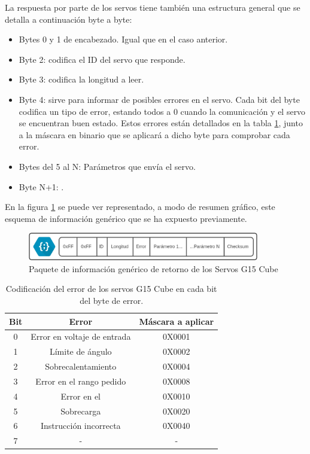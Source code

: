 	La respuesta por parte de los servos tiene también una estructura general que se detalla a continuación byte a byte:
	\begin{itemize}
		\item Bytes 0 y 1 de encabezado. Igual que en el caso anterior.
		\item Byte 2: codifica el ID del servo que responde.
		\item Byte 3: codifica la longitud a leer.
		\item Byte 4: sirve para informar de posibles errores en el servo. Cada bit del byte codifica un tipo de error, estando todos a 0 cuando la comunicación y el servo se encuentran buen estado. Estos errores están detallados en la tabla \ref{tab:g15_error}, junto a la máscara en binario que se aplicará a dicho byte para comprobar cada error.
		\item Bytes del 5 al N: Parámetros que envía el servo.
		\item Byte N+1: .
	\end{itemize}

	 En la figura \ref{fig:app:registrosg15:comunicacion_mensaje_from_servo} se puede ver representado, a modo de resumen gráfico, este esquema de información genérico que se ha expuesto previamente.

	 \begin{figure}[H]
	    	\centering
	    	\includegraphics[width=0.9\textwidth]{figuras/Imagenes_SW/Packet_From_G15.jpg}   
	    	\caption{Paquete de información genérico de retorno de los Servos G15 Cube}
	    	\label{fig:app:registrosg15:comunicacion_mensaje_from_servo}
	 \end{figure}

	\begin{table}[htbp]
		\centering
		\caption{Codificación del error de los servos G15 Cube en cada bit del byte de error.}
		\label{tab:g15_error}
		\begin{center}
			\begin{tabular}{|c|c|c|}
				\hline
				\textbf{Bit} & \textbf{Error} & \textbf{Máscara a aplicar} \\
				\hline
				0 & Error en voltaje de entrada & 0X0001 \\
				\hline
				1 & Límite de ángulo & 0X0002 \\
				\hline
				2 & Sobrecalentamiento & 0X0004 \\
				\hline
				3 & Error en el rango pedido & 0X0008 \\
				\hline
				4 & Error en el \ingles{CheckSum} & 0X0010 \\
				\hline
				5 & Sobrecarga & 0X0020 \\
				\hline
				6 & Instrucción incorrecta & 0X0040 \\
				\hline
				7 & - & -  \\
				\hline
			\end{tabular}
		\end{center}
	\end{table}

